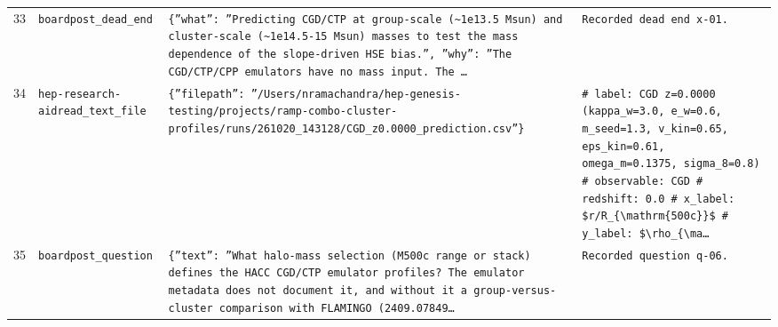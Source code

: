 \documentclass[11pt,a4paper]{article}
\begin{document}
\begin{longtable}{@{}p{}p{}p{}p{}@{}}
33 & \texttt{board}\newline\texttt{post\_\allowbreak{}dead\_\allowbreak{}end} & \texttt{\{''what'':\allowbreak{} ''Predicting CGD/\allowbreak{}CTP at group-scale (\textasciitilde{}\allowbreak{}1e13.5 Msun)\allowbreak{} and cluster-scale (\textasciitilde{}\allowbreak{}1e14.5-15 Msun)\allowbreak{} masses to test the mass dependence of the slope-driven HSE bias.'',\allowbreak{} ''why'':\allowbreak{} ''The CGD/\allowbreak{}CTP/\allowbreak{}CPP emulators have no mass input. The \ldots{}\allowbreak{}} & \texttt{Recorded dead end x-01.} \\
34 & \texttt{hep-research-aid}\newline\texttt{read\_\allowbreak{}text\_\allowbreak{}file} & \texttt{\{''filepath'':\allowbreak{} ''/\allowbreak{}Users/\allowbreak{}nramachandra/\allowbreak{}hep-genesis-testing/\allowbreak{}projects/\allowbreak{}ramp-combo-cluster-profiles/\allowbreak{}runs/\allowbreak{}261020\_\allowbreak{}143128/\allowbreak{}CGD\_\allowbreak{}z0.0000\_\allowbreak{}prediction.csv''\}\allowbreak{}} & \texttt{\# label:\allowbreak{} CGD z=\allowbreak{}0.0000 (kappa\_\allowbreak{}w=\allowbreak{}3.0,\allowbreak{} e\_\allowbreak{}w=\allowbreak{}0.6,\allowbreak{} m\_\allowbreak{}seed=\allowbreak{}1.3,\allowbreak{} v\_\allowbreak{}kin=\allowbreak{}0.65,\allowbreak{} eps\_\allowbreak{}kin=\allowbreak{}0.61,\allowbreak{} omega\_\allowbreak{}m=\allowbreak{}0.1375,\allowbreak{} sigma\_\allowbreak{}8=\allowbreak{}0.8)\allowbreak{} \# observable:\allowbreak{} CGD \# redshift:\allowbreak{} 0.0 \# x\_\allowbreak{}label:\allowbreak{} \$r/\allowbreak{}R\_\allowbreak{}\{\textbackslash{}\allowbreak{}mathrm\{500c\}\allowbreak{}\}\allowbreak{}\$ \# y\_\allowbreak{}label:\allowbreak{} \$\textbackslash{}\allowbreak{}rho\_\allowbreak{}\{\textbackslash{}\allowbreak{}ma\ldots{}\allowbreak{}} \\
35 & \texttt{board}\newline\texttt{post\_\allowbreak{}question} & \texttt{\{''text'':\allowbreak{} ''What halo-mass selection (M500c range or stack)\allowbreak{} defines the HACC CGD/\allowbreak{}CTP emulator profiles? The emulator metadata does not document it,\allowbreak{} and without it a group-versus-cluster comparison with FLAMINGO (2409.07849\ldots{}\allowbreak{}} & \texttt{Recorded question q-06.} \\

\end{longtable}
\end{document}
